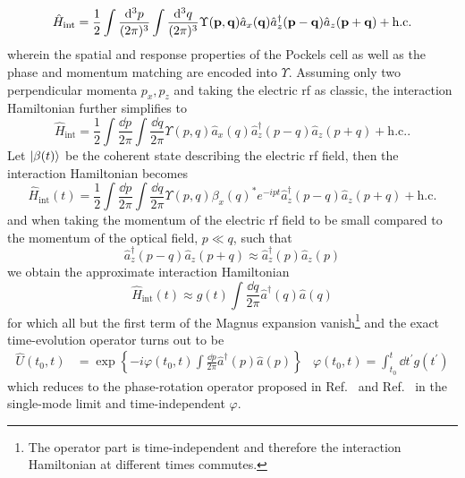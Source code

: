 \begin{equation}
	\hat{H}_\text{int}
	=
	\frac{1}{2}
	\int\frac{\dd[3]{p}}{(2\pi)^3}
	\int\frac{\dd[3]{q}}{(2\pi)^3}
	\Upsilon(\vb{p},\vb{q})
	\hat{a}_x(\vb{q})
	\hat{a}_z^\dagger(\vb{p}-\vb{q})
	\hat{a}_z(\vb{p}+\vb{q})
	+
	\text{h.c.}
\end{equation}
wherein the spatial and response properties of the Pockels cell as well as the phase and momentum matching are encoded into $\Upsilon$.
Assuming only two perpendicular momenta $p_x,p_z$ and taking the electric \gls{rf} as classic, the interaction Hamiltonian further simplifies to
\begin{equation}
	\hat{H}_\text{int}
	=
	\frac{1}{2}
	\int\frac{\dd{p}}{2\pi}
	\int\frac{\dd{q}}{2\pi}
	\Upsilon(p,q)
	\hat{a}_x(q)
	\hat{a}_z^\dagger(p-q)
	\hat{a}_z(p+q)
	+
	\text{h.c.}
	.
\end{equation}
Let $\ket{\beta(t)}$ be the coherent state describing the electric \gls{rf} field, then the interaction Hamiltonian becomes
\begin{equation}
	\hat{H}_\text{int}(t)
	=
	\frac{1}{2}
	\int\frac{\dd{p}}{2\pi}
	\int\frac{\dd{q}}{2\pi}
	\Upsilon(p,q)
	\beta_x(q)^*
	e^{-ipt}
	\hat{a}_z^\dagger(p-q)
	\hat{a}_z(p+q)
	+
	\text{h.c.}
\end{equation}
and when taking the momentum of the electric \gls{rf} field to be small compared to the momentum of the optical field, $p\ll q$, such that
\begin{equation}
	\hat{a}_z^\dagger(p-q)
	\hat{a}_z(p+q)
	\approx
	\hat{a}_z^\dagger(p)
	\hat{a}_z(p)
\end{equation}
we obtain the approximate interaction Hamiltonian
\begin{equation}
	\hat{H}_\text{int}(t)
	\approx
	g(t)
	\int\frac{\dd{q}}{2\pi}
	\hat{a}^\dagger(q)
	\hat{a}(q)
\end{equation}
for which all but the first term of the Magnus expansion vanish\footnote{The operator part is time-independent and therefore the interaction Hamiltonian at different times commutes.} and the exact time-evolution operator turns out to be
\begin{align}
	\hat{U}(t_0,t)
	&=
	\exp\left\{
		-i\varphi(t_0,t)
		\int\frac{\dd{p}}{2\pi}
		\hat{a}^\dagger(p)
		\hat{a}(p)
	\right\}
	&
	\varphi(t_0,t)
	=
	\int_{t_0}^{t}\dd{t^\prime}
	g(t^\prime)
\end{align}
which reduces to the phase-rotation operator proposed in Ref.~\cite[p.~38]{Leonhardt2010} and Ref.~\cite[p.~103]{Vogel2006} in the single-mode limit and time-independent $\varphi$.

